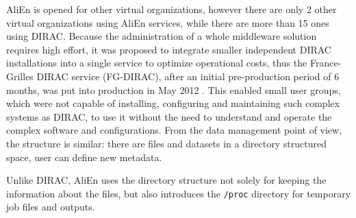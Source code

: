 AliEn is opened for other virtual organizations, however there are only 2 other virtual organizations using 
AliEn services, while there are more than 15 ones using DIRAC. Because the administration of a whole middleware 
solution requires high effort, it was proposed to integrate smaller independent DIRAC installations into 
a single service to optimize operational costs, thus the France-Grilles DIRAC service (FG-DIRAC), 
after an initial pre-production period of 6 months, was put into production in May 2012 \cite{FGDIRAC}.
This enabled small user groups, which were not capable of installing, configuring and maintaining  
such complex systems as DIRAC, to use it without the need to understand and operate the complex software and
configurations. From the data management point of view, the  structure is similar: there are files and datasets in a 
directory structured space, user can define new metadata.


Unlike DIRAC, AliEn uses the directory structure not solely for keeping the information about the files, 
but also introduces the \texttt{/proc} directory for temporary job files and outputs.